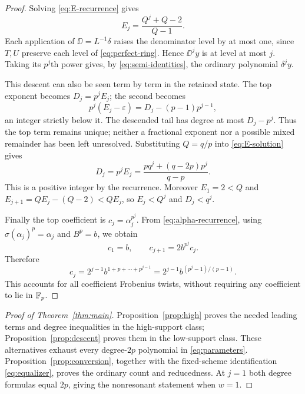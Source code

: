 \begin{proof}
Solving \eqref{eq:E-recurrence} gives
\begin{equation}\label{eq:E-solution}
 E_j=\frac{Q^j+Q-2}{Q-1}.
\end{equation}
Each application of $\DD=L^{-1}\delta$ raises the denominator
level by at most one, since $T,U$ preserve each level of
\eqref{eq:perfect-ring}. Hence $\DD^j y$ is at level at most $j$.
Taking its $p^j$th power gives, by \eqref{eq:semi-identities},
the ordinary polynomial $\delta^j y$.

This descent can also be seen term by term in the retained state.
The top exponent becomes $D_j=p^jE_j$; the second becomes
\[
 p^j(E_j-\varepsilon)=D_j-(p-1)p^{j-1},
\]
an integer strictly below it. The descended tail has degree at
most $D_j-p^j$. Thus the top term remains unique; neither a
fractional exponent nor a possible mixed remainder has been
left unresolved. Substituting $Q=q/p$ into \eqref{eq:E-solution}
gives
\[
 D_j=p^jE_j=\frac{p q^j+(q-2p)p^j}{q-p}.
\]
This is a positive integer by the recurrence. Moreover $E_1=2<Q$
and $E_{j+1}=QE_j-(Q-2)<QE_j$, so $E_j<Q^j$ and $D_j<q^j$.

Finally the top coefficient is $c_j=\alpha_j^{p^j}$. From
\eqref{eq:alpha-recurrence}, using $\sigma(\alpha_j)^p=\alpha_j$
and $B^p=b$, we obtain
\[
 c_1=b,\qquad c_{j+1}=2b^{p^j}c_j.
\]
Therefore
\[
 c_j=2^{j-1}b^{1+p+\cdots+p^{j-1}}
     =2^{j-1}b^{(p^j-1)/(p-1)}.
\]
This accounts for all coefficient Frobenius twists, without
requiring any coefficient to lie in $\mathbb F_p$.
\end{proof}

\begin{proof}[Proof of Theorem~\ref{thm:main}]
Proposition~\ref{prop:high} proves the needed leading terms and
degree inequalities in the high-support class; Proposition~\ref{prop:descent}
proves them in the low-support class. These alternatives exhaust
every degree-$2p$ polynomial in \eqref{eq:parameters}.
Proposition~\ref{prop:conversion}, together with the fixed-scheme
identification \eqref{eq:equalizer}, proves the ordinary count and
reducedness. At $j=1$ both degree formulas equal $2p$, giving the
nonresonant statement when $w=1$.
\end{proof}
